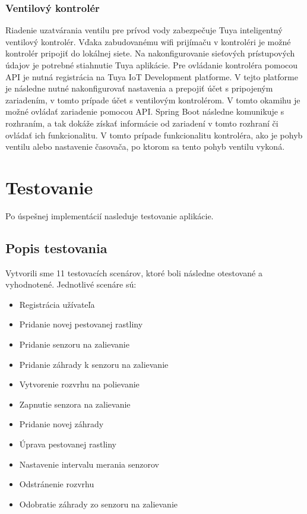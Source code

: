 \documentclass[twoside]{ctuthesis}
\theoremstyle{plain}
\theoremstyle{definition}
\theoremstyle{note}
\begin{document}
\subsection{Ventilový kontrolér}
Riadenie uzatvárania ventilu pre prívod vody zabezpečuje Tuya inteligentný ventilový kontrolér. Vďaka zabudovanému wifi prijímaču v kontroléri je možné kontrolér pripojiť do lokálnej siete. Na nakonfigurovanie sieťových prístupových údajov je potrebné stiahnutie Tuya aplikácie. Pre ovládanie kontroléra pomocou API je nutná registrácia na Tuya IoT Development platforme. V tejto platforme je následne nutné nakonfigurovať nastavenia a prepojiť účet s pripojeným zariadením, v tomto prípade účet s ventilovým kontrolérom. V tomto okamihu je možné ovládať zariadenie pomocou API. Spring Boot následne komunikuje s rozhraním, a tak dokáže získať informácie od zariadení v tomto rozhraní či ovládať ich funkcionalitu. V tomto prípade funkcionalitu kontroléra, ako je pohyb ventilu alebo nastavenie časovača, po ktorom sa tento pohyb ventilu vykoná.

\chapter{Testovanie}
Po úspešnej implementácií nasleduje testovanie aplikácie.

\section{Popis testovania}
 Vytvorili sme 11 testovacích scenárov, ktoré boli následne otestované a vyhodnotené.
\newline
\newline
	Jednotlivé scenáre sú:
\begin{itemize}
\item Registrácia užívateľa
\item Pridanie novej pestovanej rastliny
\item Pridanie senzoru na zalievanie
\item Pridanie záhrady k senzoru na zalievanie
\item Vytvorenie rozvrhu na polievanie
\item Zapnutie senzora na zalievanie
\item Pridanie novej záhrady
\item Úprava pestovanej rastliny
\item Nastavenie intervalu merania senzorov
\item Odstránenie rozvrhu
\item Odobratie záhrady zo senzoru na zalievanie
\end{itemize}
 
\end{document}
